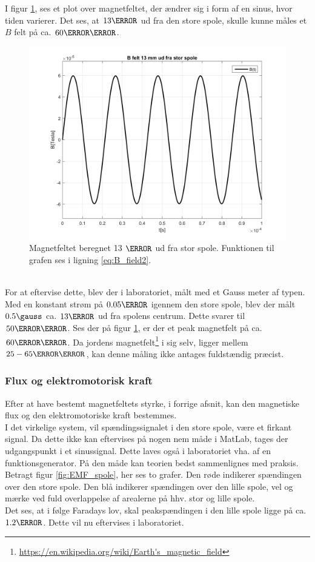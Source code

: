 I figur \ref{fig:B_felt_stor_spole}, ses et plot over magnetfeltet, der ændrer sig i form af en sinus, hvor tiden varierer.
Det ses, at $13\mm$ ud fra den store spole, skulle kunne måles et $B$ felt på ca. $60\micro\tesla$.\\
\begin{figure}[h!]
	\centering
	\includegraphics[width=1\textwidth]{billeder/B_felt_stor_spole.png}
	\caption{Magnetfeltet beregnet 13 $\mm$ ud fra stor spole. Funktionen til grafen ses i ligning \ref{eq:B_field2}.}
	\label{fig:B_felt_stor_spole}
\end{figure}\\
For at eftervise dette, blev der i laboratoriet, målt med et Gauss meter af typen. 
Med en konstant strøm på $0.05\ampere$ igennem den store spole, blev der målt $0.5 \gauss$ ca. $13\mm$ ud fra spolens centrum. 
Dette svarer til $50 \micro\tesla$. 
Ses der på figur \ref{fig:B_felt_stor_spole}, er der et peak magnetfelt på ca. $60\micro\tesla$.
Da jordens magnetfelt\footnote{\url{https://en.wikipedia.org/wiki/Earth's_magnetic_field}} i sig selv, ligger mellem $25-65\micro\tesla$, kan denne måling ikke antages fuldstændig præcist.

\subsubsection{Flux og elektromotorisk kraft}
Efter at have bestemt magnetfeltets styrke, i forrige afsnit, kan den magnetiske flux og den elektromotoriske kraft bestemmes.\\
I det virkelige system, vil spændingssignalet i den store spole, være et firkant signal.
Da dette ikke kan eftervises på nogen nem måde i MatLab, tages der udgangspunkt i et sinussignal.
Dette laves også i laboratoriet vha. af en funktionsgenerator.
På den måde kan teorien bedst sammenlignes med praksis.\\
Betragt figur \ref{fig:EMF_spole}, her ses to grafer.
Den røde indikerer spændingen over den store spole.
Den blå indikerer spændingen over den lille spole, vel og mærke ved fuld overlappelse af arealerne på hhv. stor og lille spole.\\
Det ses, at i følge Faradays lov, skal peakspændingen i den lille spole ligge på ca. $1.2\volt$.
Dette vil nu eftervises i laboratoriet.

